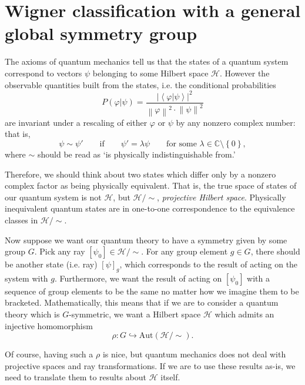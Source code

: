 \documentclass[a4paper]{report}
\newcommand{\C}{\mathbb{C}}
\newcommand{\norm}[1]{\left\lVert#1\right\rVert}
\theoremstyle{definition}
\theoremstyle{plain}
\theoremstyle{remark}
\begin{document}
\section{Wigner classification with a general global symmetry group}

The axioms of quantum mechanics tell us that the states of a quantum system correspond to vectors $\psi$ belonging to some Hilbert space $\mathscr{H}$. However the observable quantities built from the states, i.e. the conditional probabilities
\begin{equation*}
  P(\varphi | \psi) = \frac{\left|\left\langle \varphi | \psi \right\rangle\right|^{2}}{\norm{\varphi}^{2} \cdot \norm{\psi}^{2}}
\end{equation*}
are invariant under a rescaling of either $\varphi$ or $\psi$ by any nonzero complex number: that is,
\begin{equation*}
  \psi \sim \psi' \qquad\text{if}\qquad \psi' = \lambda \psi\qquad\text{for some }\lambda \in \C\setminus\left\{ 0 \right\},
\end{equation*}
where $\sim$ should be read as `is physically indistinguishable from.'

Therefore, we should think about two states which differ only by a nonzero complex factor as being physically equivalent. That is, the true space of states of our quantum system is not $\mathscr{H}$, but $\mathscr{H} / \sim$, \emph{projective Hilbert space}. Physically inequivalent quantum states are in one-to-one correspondence to the equivalence classes in $\mathscr{H}/\sim$.

Now suppose we want our quantum theory to have a symmetry given by some group $G$. Pick any ray $[\psi_{0}] \in \mathscr{H}/\sim$. For any group element $g \in G$, there should be another state (i.e. ray) $[\psi]_{g}$, which corresponds to the result of acting on the system with $g$. Furthermore, we want the result of acting on $[\psi_{0}]$ with a sequence of group elements to be the same no matter how we imagine them to be bracketed. Mathematically, this means that if we are to consider a quantum theory which is $G$-symmetric, we want a Hilbert space $\mathscr{H}$ which admits an injective homomorphism
\begin{equation*}
  \rho\colon G \hookrightarrow \mathrm{Aut}(\mathscr{H}/\sim).
\end{equation*}

Of course, having such a $\rho$ is nice, but quantum mechanics does not deal with projective spaces and ray transformations. If we are to use these results as-is, we need to translate them to results about $\mathscr{H}$ itself.
\end{document}
